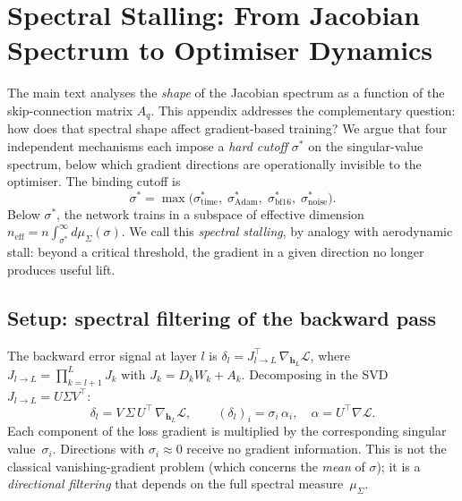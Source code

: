 
\section{Spectral Stalling: From Jacobian Spectrum to Optimiser Dynamics}\label{app:spectral-stalling}

The main text analyses the \emph{shape} of the Jacobian spectrum as a function of the skip-connection matrix $A_q$. This appendix addresses the complementary question: how does that spectral shape affect gradient-based training? We argue that four independent mechanisms each impose a \emph{hard cutoff} $\sigma^*$ on the singular-value spectrum, below which gradient directions are operationally invisible to the optimiser. The binding cutoff is
\begin{equation}\label{eq:sigma-star}
\sigma^* = \max\!\bigl(\sigma^*_{\mathrm{time}},\; \sigma^*_{\mathrm{Adam}},\; \sigma^*_{\mathrm{bf16}},\; \sigma^*_{\mathrm{noise}}\bigr).
\end{equation}
Below $\sigma^*$, the network trains in a subspace of effective dimension $n_{\mathrm{eff}} = n\!\int_{\sigma^*}^{\infty}\!d\mu_\Sigma(\sigma)$. We call this \emph{spectral stalling}, by analogy with aerodynamic stall: beyond a critical threshold, the gradient in a given direction no longer produces useful lift.

\subsection{Setup: spectral filtering of the backward pass}\label{app:stalling-setup}

The backward error signal at layer $l$ is $\delta_l = J_{l\to L}^\top \,\nabla_{\mathbf{h}_L}\!\mathcal{L}$, where $J_{l\to L} = \prod_{k=l+1}^{L} J_k$ with $J_k = D_k W_k + A_k$. Decomposing in the SVD $J_{l\to L} = U\Sigma V^\top$:
\begin{equation}\label{eq:spectral-filtering}
\delta_l = V\,\Sigma\,U^\top\,\nabla_{\mathbf{h}_L}\!\mathcal{L}, \qquad (\delta_l)_i = \sigma_i\,\alpha_i, \quad \alpha = U^\top\nabla\mathcal{L}.
\end{equation}
Each component of the loss gradient is multiplied by the corresponding singular value~$\sigma_i$. Directions with $\sigma_i \approx 0$ receive no gradient information. This is not the classical vanishing-gradient problem (which concerns the \emph{mean} of $\sigma$); it is a \emph{directional filtering} that depends on the full spectral measure~$\mu_\Sigma$.

